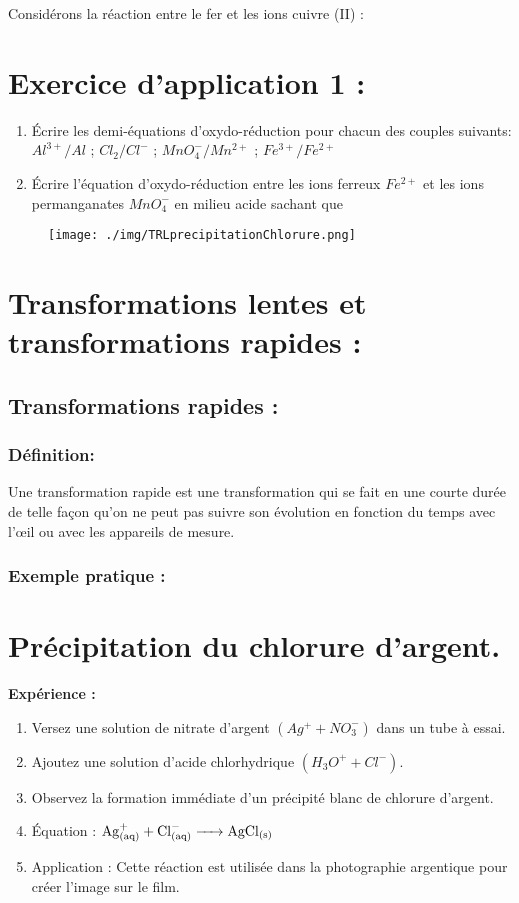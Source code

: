\documentclass[12pt]{article}
\begin{document}
Considérons la réaction entre le fer et les ions cuivre (II) :

\section*{Exercice d'application 1  : }
\begin{enumerate}
	\item Écrire les demi-équations d'oxydo-réduction pour chacun des couples suivants: $Al^{3+}/Al$ ; $Cl_2/Cl^-$ ; $MnO_4^-/Mn^{2+}$ ; $Fe^{3+}/Fe^{2+}$
	\item Écrire l'équation d'oxydo-réduction entre les ions ferreux $Fe^{2+}$ et les ions permanganates $MnO_4^-$ en milieu acide sachant que  
\end{enumerate}

\begin{wrapfigure}[2]{r}{0.2\textwidth}
	\vspace{-1.95cm}
	\texttt{[image: ./img/TRLprecipitationChlorure.png]}
\end{wrapfigure}


\section{Transformations lentes et transformations rapides : }
\subsection{Transformations rapides :  }
\subsubsection{ Définition: }
Une transformation rapide est une transformation qui se fait en une courte durée de telle façon qu'on ne peut pas suivre son
évolution en fonction du temps avec l'œil ou avec les appareils de mesure.

\subsubsection{Exemple pratique :}

\section*{Précipitation du chlorure d'argent.}
\textbf{Expérience :}

\begin{enumerate}
  \item Versez une solution de nitrate d'argent $(Ag^+ + NO_3^-)$ dans un tube à essai.
  \item Ajoutez une solution d'acide chlorhydrique $(H_3O^+  + Cl^-)$.
  \item Observez la formation immédiate d'un précipité blanc de chlorure d'argent.
  \item Équation : $\ce{Ag^+_{(aq)} +Cl^-_{(aq)} -> AgCl_{(s)} }$
  \item Application : Cette réaction est utilisée dans la photographie argentique pour créer l'image sur le film.
\end{enumerate}
\end{document}
